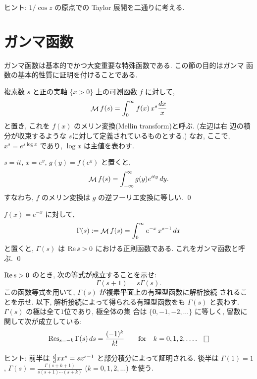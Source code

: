 \documentclass[12pt,twoside]{jarticle}
\begin{document}
\noindent
ヒント: $1/\cos z$ の原点での Taylor 展開を二通りに考える. 


\section{ガンマ函数}

ガンマ函数は基本的でかつ大変重要な特殊函数である. この節の目的はガンマ
函数の基本的性質に証明を付けることである. 

複素数 $s$ と正の実軸 $\{x > 0\}$ 上の可測函数 $f$ に対して,
\[
  \mathop{\mathcal{M}}\nolimits f(s) = \int_0^\infty f(x) \, x^s \frac{dx}{x}
\]%
と置き, これを $f(x)$ のメリン変換(Mellin transform)と呼ぶ. (左辺は右
辺の積分が収束するような $s$に対して定義されているものとする.) なお, 
ここで, $x^s = e^{s\log x}$ であり, $\log x$ は主値を表わす.

\begin{question}[メリン変換とフーリエ変換の関係]
  $s=it$, $x=e^y$, $g(y)=f(e^y)$ と置くと,
  \[
    \mathop{\mathcal{M}}\nolimits f(s) = \int_{-\infty}^\infty g(y) e^{ity}\, dy.
  \]
  すなわち, $f$ のメリン変換は $g$ の逆フーリエ変換に等しい.
  \qed
\end{question}

\begin{question}[ガンマ函数の定義]
  $f(x) = e^{-x}$ に対して, 
  \[
    \Gamma(s)
    := \mathop{\mathcal{M}}\nolimits f(s) = \int_0^\infty e^{-x}\,x^{s-1}\,dx
  \]%
  と置くと, $\Gamma(s)$ は $\mathop{\mathrm{Re}}\nolimits s > 0$ における正則函数である.
  これをガンマ函数と呼ぶ.
  \qed
\end{question}

\begin{question}[函数等式と解析接続]
\label{q:Gamma-func-id}
  $\mathop{\mathrm{Re}}\nolimits s > 0$ のとき, 次の等式が成立することを示せ:
  \[
    \Gamma(s+1) = s \Gamma(s).
  \]%
  この函数等式を用いて, $\Gamma(s)$ が複素平面上の有理型函数に解析接続
  されることを示せ. 以下, 解析接続によって得られる有理型函数をも 
  $\Gamma(s)$ と表わす. $\Gamma(s)$ の極は全て$1$位であり, 極全体の集
  合は $\{0,-1,-2,\dots\}$ に等しく, 留数に関して次が成立している:
  \[
    \Res_{s=-k} \Gamma(s)\,ds = \frac{(-1)^k}{k!}
    \qquad\mbox{for}\quad
    k = 0,1,2,\dots.
  \qed
  \]%
\end{question}

\noindent ヒント: 
前半は $\frac{d}{d }{x}x^s = s x^{s-1}$ と部分積分によって証明される. 
後半は $\Gamma(1)=1$, $\Gamma(s) = \frac{\Gamma(s+k+1)}{s(s+1)\cdots(s+k)}$
($k=0,1,2,\dots$) を使う.
\end{document}
